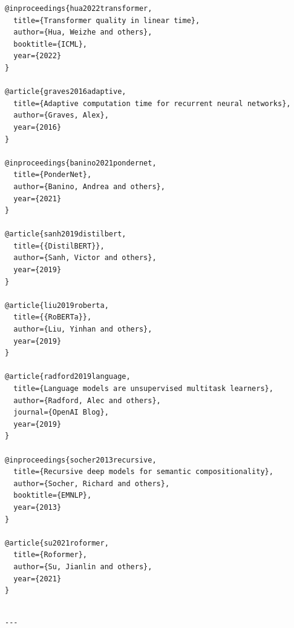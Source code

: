 \begin{lstlisting}
@inproceedings{hua2022transformer,
  title={Transformer quality in linear time},
  author={Hua, Weizhe and others},
  booktitle={ICML},
  year={2022}
}

@article{graves2016adaptive,
  title={Adaptive computation time for recurrent neural networks},
  author={Graves, Alex},
  year={2016}
}

@inproceedings{banino2021pondernet,
  title={PonderNet},
  author={Banino, Andrea and others},
  year={2021}
}

@article{sanh2019distilbert,
  title={{DistilBERT}},
  author={Sanh, Victor and others},
  year={2019}
}

@article{liu2019roberta,
  title={{RoBERTa}},
  author={Liu, Yinhan and others},
  year={2019}
}

@article{radford2019language,
  title={Language models are unsupervised multitask learners},
  author={Radford, Alec and others},
  journal={OpenAI Blog},
  year={2019}
}

@inproceedings{socher2013recursive,
  title={Recursive deep models for semantic compositionality},
  author={Socher, Richard and others},
  booktitle={EMNLP},
  year={2013}
}

@article{su2021roformer,
  title={Roformer},
  author={Su, Jianlin and others},
  year={2021}
}
\end{lstlisting}
\begin{lstlisting}

---
\end{lstlisting}